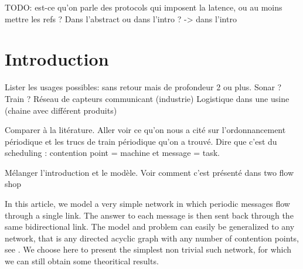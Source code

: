 \documentclass[10pt, conference, letterpaper]{IEEEtran}
\newcommand{\todo}[1]{{\color{red} TODO: {#1}}}
\begin{document}
\todo{est-ce qu'on parle des protocols qui imposent la latence, ou au moins mettre les refs ? Dans l'abstract ou dans l'intro ? -> dans l'intro}

\section{Introduction}

Lister les usages possibles: 
sans retour mais de profondeur 2 ou plus. Sonar ? Train ?
Réseau de capteurs communicant (industrie)
Logistique dans une usine (chaine avec différent produits)

Comparer à la litérature. Aller voir ce qu'on nous a cité sur l'ordonnancement périodique 
et les trucs de train périodique qu'on a trouvé.
Dire que c'est du scheduling : contention point = machine et message = task.


Mélanger l'introduction et le modèle. Voir comment c'est présenté dans two flow shop

In this article, we model a very simple network in which periodic messages flow through a single link. The answer to each message is then sent back through the same bidirectional link. The model and problem can easily be generalized to any network, that is any directed acyclic graph with any number of contention points, see \cite{dominique2018deterministic}. We choose here to present the simplest non trivial such network, for which we can still obtain some theoritical results. 
\end{document}
